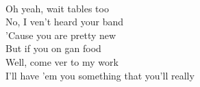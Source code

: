   \\
Oh yeah,  wait tables too \\
No, I ven't heard your band \\
'Cause you  are pretty new \\
But if you  on gan food \\
Well, come ver to my work \\
I'll have 'em  you something that you'll really 

